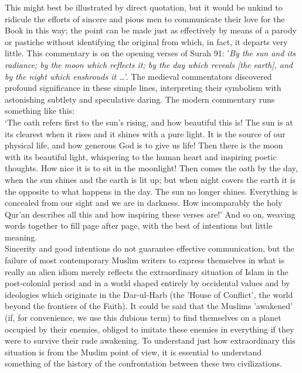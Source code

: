 \documentclass[10pt, twoside,openright]{book}
\begin{document}
This might best be illustrated by direct quotation, but it would be unkind to ridicule the efforts of sincere and pious men to communicate their love for the Book in this way; the point can be made just as effectively by means of a parody or pastiche without identifying the original from which, in fact, it departs very little. This commentary is on the opening verses of Surah 91: '\emph{By the sun and its radiance; by the moon which reflects it; by the day which reveals [the earth], and by the night which enshrouds it \ldots{}}'. The medieval commentators discovered profound significance in these simple lines, interpreting their symbolism with astonishing subtlety and speculative daring. The modern commentary runs something like this:\\

`The oath refers first to the sun's rising, and how beautiful this is! The sun is at its clearest when it rises and it shines with a pure light. It is the source of our physical life, and how generous God is to give us life! Then there is the moon with its beautiful light, whispering to the human heart and inspiring poetic thoughts. How nice it is to sit in the moonlight! Then comes the oath by the day, when the sun shines and the earth is lit up; but when night covers the earth it is the opposite to what happens in the day. The sun no longer shines. Everything is concealed from our sight and we are in darkness. How incomparably the holy Qur'an describes all this and how inspiring these verses are!' And so on, weaving words together to fill page after page, with the best of intentions but little meaning. \\

Sincerity and good intentions do not guarantee effective communication, but the failure of most contemporary Muslim writers to express themselves in what is really an alien idiom merely reflects the extraordinary situation of Islam in the post\hyp{}colonial period and in a world shaped entirely by occidental values and by ideologies which originate in the Dar\hyp{}ul\hyp{}Harb (the 'House of Conflict', the world beyond the frontiers of the Faith). It could be said that the Muslims 'awakened' (if, for convenience, we use this dubious term) to find themselves on a planet occupied by their enemies, obliged to imitate these enemies in everything if they were to survive their rude awakening. To understand just how extraordinary this situation is from the Muslim point of view, it is essential to understand something of the history of the confrontation between these two civilizations. \\
\end{document}
